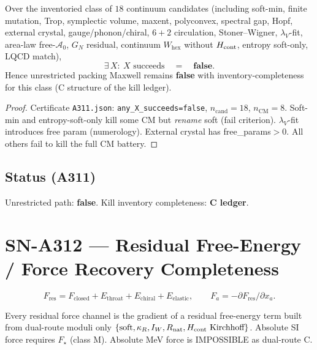 \begin{theorem}
\label{thm:A311}
Over the inventoried class of $18$ continuum candidates
(including soft-min, finite mutation, Trop, symplectic volume, maxent, polyconvex,
spectral gap, Hopf, external crystal, gauge/phonon/chiral, $6{+}2$ circulation,
Stoner--Wigner, $\lambda_V$-fit, area-law free-$\mathcal{A}_0$, $G_N$ residual,
continuum $W_{\mathrm{hex}}$ without $H_{\rm cont}$, entropy soft-only, LQCD match),
\begin{equation}
\exists\, X:\ \text{$X$ succeeds}
\quad=\quad
\mathbf{false}.
\end{equation}
Hence unrestricted packing Maxwell remains \textbf{false} with inventory-completeness
for this class (C structure of the kill ledger).
\end{theorem}

\begin{proof}
Certificate \texttt{A311.json}: \texttt{any\_X\_succeeds=false}, $n_{\mathrm{cand}}=18$, $n_{\mathrm{CM}}=8$.
Soft-min and entropy-soft-only kill some CM but \emph{rename} soft (fail criterion).
$\lambda_V$-fit introduces free param (numerology). External crystal has free\_params${>}0$.
All others fail to kill the full CM battery.
\end{proof}

\subsection*{Status (A311)}
Unrestricted path: \textbf{false}. Kill inventory completeness: \textbf{C ledger}.

\section{SN-A312 --- Residual Free-Energy / Force Recovery Completeness}
\label{sec:SN-A312}

\begin{definition}
\begin{equation}
F_{\mathrm{res}}
=
F_{\mathrm{closed}}
+
E_{\mathrm{throat}}
+
E_{\mathrm{chiral}}
+
E_{\mathrm{elastic}},
\qquad
F_a=-\partial F_{\mathrm{res}}/\partial x_a.
\end{equation}
\end{definition}

\begin{theorem}
\label{thm:A312}
Every residual force channel is the gradient of a residual free-energy term built from
dual-route moduli only $\{\mathrm{soft},\kappa_R,I_W,R_{\rm nat},H_{\rm cont}\text{ Kirchhoff}\}$.
Absolute SI force requires $F_\star$ (class M). Absolute MeV force is IMPOSSIBLE as dual-route C.
\end{theorem}


